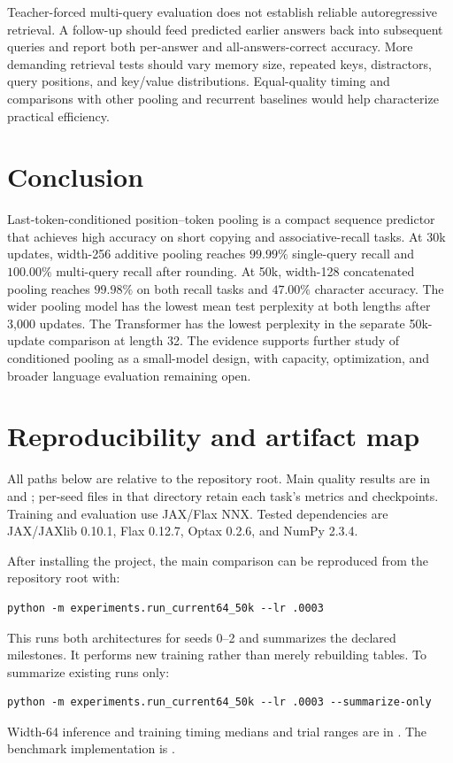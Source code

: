 \documentclass[11pt]{article}
\begin{document}
Teacher-forced multi-query evaluation does not establish reliable autoregressive retrieval. A follow-up should feed predicted earlier answers back into subsequent queries and report both per-answer and all-answers-correct accuracy. More demanding retrieval tests should vary memory size, repeated keys, distractors, query positions, and key/value distributions. Equal-quality timing and comparisons with other pooling and recurrent baselines would help characterize practical efficiency.

\section{Conclusion}
Last-token-conditioned position--token pooling is a compact sequence predictor that achieves high accuracy on short copying and associative-recall tasks. At 30k updates, width-256 additive pooling reaches \(99.99\%\) single-query recall and \(100.00\%\) multi-query recall after rounding. At 50k, width-128 concatenated pooling reaches \(99.98\%\) on both recall tasks and \(47.00\%\) character accuracy. The wider pooling model has the lowest mean test perplexity at both lengths after 3,000 updates. The Transformer has the lowest perplexity in the separate 50k-update comparison at length 32. The evidence supports further study of conditioned pooling as a small-model design, with capacity, optimization, and broader language evaluation remaining open.

\appendix
\section{Reproducibility and artifact map}
All paths below are relative to the repository root. Main quality results are in  and ; per-seed files in that directory retain each task's metrics and checkpoints. Training and evaluation use JAX/Flax NNX. Tested dependencies are JAX/JAXlib 0.10.1, Flax 0.12.7, Optax 0.2.6, and NumPy 2.3.4.

After installing the project, the main comparison can be reproduced from the repository root with:
\begin{verbatim}
python -m experiments.run_current64_50k --lr .0003
\end{verbatim}
This runs both architectures for seeds 0--2 and summarizes the declared milestones. It performs new training rather than merely rebuilding tables. To summarize existing runs only:
\begin{verbatim}
python -m experiments.run_current64_50k --lr .0003 --summarize-only
\end{verbatim}
Width-64 inference and training timing medians and trial ranges are in . The benchmark implementation is .
\end{document}
